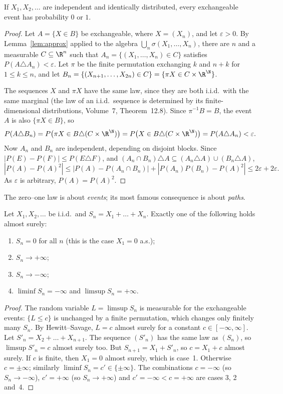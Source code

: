 \begin{theorem}\label{thm:hewittsavage}
If $X_1,X_2,\dots$ are independent and identically distributed, every exchangeable event has probability $0$ or $1$.
\end{theorem}
\begin{proof}
Let $A=\{X\in B\}$ be exchangeable, where $X=(X_n)$, and let $\varepsilon>0$. By Lemma~\ref{lem:approx} applied to the
algebra $\bigcup_n\sigma(X_1,\dots,X_n)$, there are $n$ and a measurable $C\subseteq\R^n$ such that $A_n=\{(X_1,\dots,X_n)\in
C\}$ satisfies $P(A\triangle A_n)<\varepsilon$. Let $\pi$ be the finite permutation exchanging $k$ and $n+k$ for $1\le k\le n$,
and let $B_n=\{(X_{n+1},\dots,X_{2n})\in C\}=\{\pi X\in C\times\R^{\N}\}$.

The sequences $X$ and $\pi X$ have the same law, since they are both i.i.d.\ with the same marginal (the law of an i.i.d.\
sequence is determined by its finite-dimensional distributions, Volume~7, Theorem~12.8). Since $\pi^{-1}B=B$, the event
$A$ is also $\{\pi X\in B\}$, so
\[
P(A\triangle B_n)=P\bigl(\pi X\in B\triangle(C\times\R^\N)\bigr)=P\bigl(X\in B\triangle(C\times\R^\N)\bigr)=P(A\triangle A_n)<\varepsilon.
\]
Now $A_n$ and $B_n$ are independent, depending on disjoint blocks. Since $|P(E)-P(F)|\le P(E\triangle F)$, and $(A_n\cap
B_n)\triangle A\subseteq(A_n\triangle A)\cup(B_n\triangle A)$,
\[
|P(A)-P(A)^2|\le|P(A)-P(A_n\cap B_n)|+|P(A_n)P(B_n)-P(A)^2|\le2\varepsilon+2\varepsilon.
\]
As $\varepsilon$ is arbitrary, $P(A)=P(A)^2$.
\end{proof}

The zero--one law is about \emph{events}; its most famous consequence is about \emph{paths}.

\begin{theorem}\label{thm:trichotomy}
Let $X_1,X_2,\dots$ be i.i.d.\ and $S_n=X_1+\dots+X_n$. Exactly one of the following holds almost surely:
\begin{enumerate}
\item $S_n=0$ for all $n$ (this is the case $X_1=0$ a.s.);
\item $S_n\to+\infty$;
\item $S_n\to-\infty$;
\item $\liminf S_n=-\infty$ and $\limsup S_n=+\infty$.
\end{enumerate}
\end{theorem}
\begin{proof}
The random variable $L=\limsup S_n$ is measurable for the exchangeable events: $\{L\le c\}$ is unchanged by a finite
permutation, which changes only finitely many $S_n$. By Hewitt--Savage, $L=c$ almost surely for a constant
$c\in[-\infty,\infty]$. Let $S'_n=X_2+\dots+X_{n+1}$. The sequence $(S'_n)$ has the same law as $(S_n)$, so $\limsup S'_n=c$
almost surely too. But $S_{n+1}=X_1+S'_n$, so $c=X_1+c$ almost surely. If $c$ is finite, then $X_1=0$ almost surely, which
is case~1. Otherwise $c=\pm\infty$; similarly $\liminf S_n=c'\in\{\pm\infty\}$. The combinations $c=-\infty$ (so $S_n\to-\infty$),
$c'=+\infty$ (so $S_n\to+\infty$) and $c'=-\infty<c=+\infty$ are cases 3, 2 and~4.
\end{proof}

